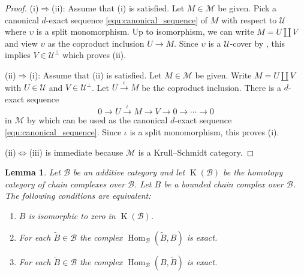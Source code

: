 \documentclass[12pt,reqno]{amsart}
\def\cB{\mathscr{B}}
\def\cM{\mathscr{M}}
\def\cU{\mathscr{U}}
\def\Hom{\operatorname{Hom}}
\def\K{\operatorname{K}}
\numberwithin{equation}{section}
\newtheorem{Lemma}{Lemma}[section]
\theoremstyle{definition}
\theoremstyle{theorem}
\theoremstyle{definition}
\begin{document}
\begin{proof}
(i)$\Rightarrow$(ii):  Assume that (i) is satisfied.  Let $M \in \cM$ be given.  Pick a canonical $d$-exact sequence \eqref{equ:canonical_sequence} of $M$ with respect to $\cU$ where $\upsilon$ is a split monomorphism.  Up to isomorphism, we can write $M = U \coprod V$ and view $\upsilon$ as the coproduct inclusion $U \xrightarrow{} M$.  Since $\upsilon$ is a $\cU$-cover by \cite[lem.\ 2.7(i)]{Jorgensen_Torsion-classes-in-higher-homological-algebra}, this implies $V \in \cU^{ \perp }$ which proves (ii).

(ii)$\Rightarrow$(i):  Assume that (ii) is satisfied.  Let $M \in \cM$ be given.  Write $M = U \coprod V$ with $U \in \cU$ and $V \in \cU^{ \perp }$.  Let $U \xrightarrow{ \iota } M$ be the coproduct inclusion.  There is a $d$-exact sequence 
\begin{equation}
\label{equ:lem:criterion_for_splitting:20}
  0
  \xrightarrow{} U
  \xrightarrow{ \iota } M
  \xrightarrow{} V
  \xrightarrow{} 0
  \xrightarrow{} \cdots
  \xrightarrow{} 0
\end{equation}
in $\cM$ by \cite[prop.\ 2.2]{Jasso-Kvamme_Introduction-to_higher_AR-theory} which can be used as the canonical $d$-exact sequence \eqref{equ:canonical_sequence}.  Since $\iota$ is a split monomorphism, this proves (i).

(ii)$\Leftrightarrow$(iii) is immediate because $\cM$ is a Krull--Schmidt category.
\end{proof}


\begin{Lemma}
\label{lem:criterion_for_contractible}
Let $\cB$ be an additive category and let $\K( \cB )$ be the homotopy category of chain complexes over $\cB\!$.  Let $B$ be a bounded chain complex over $\cB\!$.  The following conditions are equivalent:
\begin{enumerate}
\setlength\itemsep{4pt}

  \item  $B$ is isomorphic to zero in $\K( \cB )$.

  \item  For each $\widetilde{ B } \in \cB$ the complex $\Hom_{ \cB }( \widetilde{ B },B )$ is exact.
  
  \item  For each $\widetilde{ B } \in \cB$ the complex $\Hom_{ \cB }( B,\widetilde{ B } )$ is exact.

\end{enumerate}
\end{Lemma}
\end{document}

